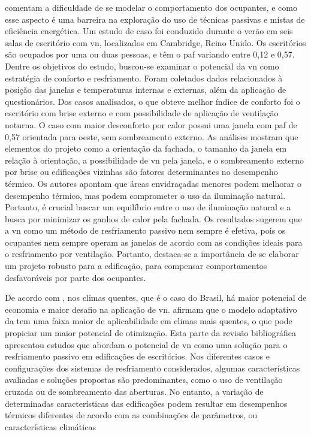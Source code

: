 \documentclass[brazil,hardcopy,openany]{ufscthesis} %
\begin{document}
 comentam a dificuldade de se modelar o comportamento dos ocupantes, e como esse aspecto é uma barreira na exploração do uso de técnicas passivas e mistas de eficiência energética. Um estudo de caso foi conduzido durante o verão em seis salas de escritório com \acrshort{vn}, localizados em Cambridge, Reino Unido. Os escritórios são ocupados por uma ou duas pessoas, e têm o \acrshort{paf} variando entre 0,12 e 0,57. Dentre os objetivos do estudo, buscou-se examinar o potencial da \acrshort{vn} como estratégia de conforto e resfriamento. Foram coletados dados relacionados à posição das janelas e temperaturas internas e externas, além da aplicação de questionários.
Dos casos analisados, o que obteve melhor índice de conforto foi o escritório com brise externo e com possibilidade de aplicação de ventilação noturna. O caso com maior desconforto por calor possui uma janela com \acrshort{paf} de 0,57 orientada para oeste, sem sombreamento externo. As análises mostram que elementos do projeto como a orientação da fachada, o tamanho da janela em relação à orientação, a possibilidade de \acrlong{vn} pela janela, e o sombreamento externo por brise ou edificações vizinhas são fatores determinantes no desempenho térmico. Os autores apontam que áreas envidraçadas menores podem melhorar o desempenho térmico, mas podem comprometer o uso da iluminação natural. Portanto, é crucial buscar um equilíbrio entre o uso de iluminação natural e a busca por minimizar os ganhos de calor pela fachada. Os resultados sugerem que a \acrshort{vn} como um método de resfriamento passivo nem sempre é efetiva, pois os ocupantes nem sempre operam as janelas de acordo com as condições ideais para o resfriamento por ventilação. Portanto, destaca-se a importância de se elaborar um projeto robusto para a edificação, para compensar comportamentos desfavoráveis por parte dos ocupantes.

De acordo com , nos climas quentes, que é o caso do Brasil, há maior potencial de economia e maior desafio na aplicação de \acrshort{vn}.  afirmam que o modelo adaptativo da  tem uma faixa maior de aplicabilidade em climas mais quentes, o que pode propiciar um maior potencial de otimização.
Esta parte da revisão bibliográfica apresentou estudos que abordam o potencial de \acrshort{vn} como uma solução para o resfriamento passivo em edificações de escritórios. Nos diferentes casos e configurações dos sistemas de resfriamento considerados, algumas características avaliadas e soluções propostas são predominantes, como o uso de ventilação cruzada ou de sombreamento das aberturas.
No entanto, a variação de determinadas características das edificações podem resultar em desempenhos térmicos diferentes de acordo com as combinações de parâmetros, ou características climáticas 
\end{document}
